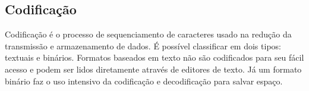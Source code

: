 \subsection[Codificação]{Codificação}

Codificação é o processo de sequenciamento de caracteres usado na redução da transmissão e armazenamento de dados. É possível classificar em dois tipos: textuais e binários. Formatos baseados em texto não são codificados para seu fácil acesso e podem ser lidos diretamente através de editores de texto. Já um formato binário faz o uso intensivo da codificação e decodificação para salvar espaço. \cite{Queiros2014}
